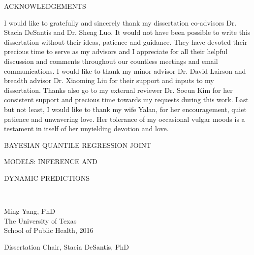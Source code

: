 \newpage
\thispagestyle{empty}
\doublespacing
\begin{center}
ACKNOWLEDGEMENTS
\end{center}
I would like to gratefully and sincerely thank my dissertation co-advisors Dr. Stacia DeSantis and Dr. Sheng Luo. It would not have been possible to write this dissertation without their ideas, patience and guidance. They have devoted their precious time to serve as my advisors and I appreciate for all their helpful discussion and comments throughout our countless meetings and email communications. I would like to thank my minor advisor Dr. David Lairson and breadth advisor Dr. Xiaoming Liu for their support and inputs to my dissertation. Thanks also go to my external reviewer Dr. Soeun Kim for her consistent support and precious time towards my requests during this work. Last but not least, I would like to thank my wife Yalan, for her encouragement, quiet patience and unwavering love. Her tolerance of my occasional vulgar moods is a testament in itself of her unyielding devotion and love. 


\newpage
\doublespacing
\begin{center}
{\normalsize BAYESIAN QUANTILE REGRESSION JOINT\par
MODELS: INFERENCE AND\par
DYNAMIC PREDICTIONS}\par
\ \par
\singlespacing
Ming Yang, PhD\\
The University of Texas\\
School of Public Health, 2016
\end{center}

\doublespacing
\noindent
Dissertation Chair, Stacia DeSantis, PhD\\

